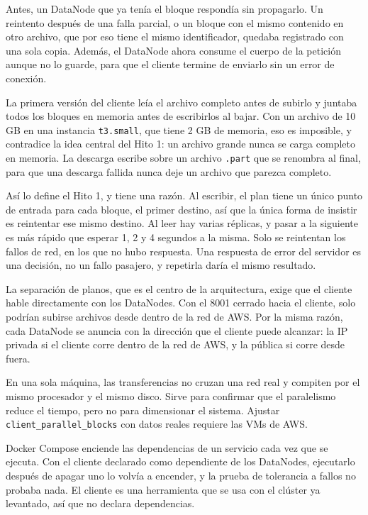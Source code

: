 \documentclass[10pt]{article}
\begin{document}
 Antes, un DataNode que ya tenía el bloque respondía sin propagarlo. Un reintento después de una falla parcial, o un bloque con el mismo contenido en otro archivo, que por eso tiene el mismo identificador, quedaba registrado con una sola copia. Además, el DataNode ahora consume el cuerpo de la petición aunque no lo guarde, para que el cliente termine de enviarlo sin un error de conexión.

 La primera versión del cliente leía el archivo completo antes de subirlo y juntaba todos los bloques en memoria antes de escribirlos al bajar. Con un archivo de 10 GB en una instancia \texttt{t3.small}, que tiene 2 GB de memoria, eso es imposible, y contradice la idea central del Hito 1: un archivo grande nunca se carga completo en memoria. La descarga escribe sobre un archivo \texttt{.part} que se renombra al final, para que una descarga fallida nunca deje un archivo que parezca completo.

 Así lo define el Hito 1, y tiene una razón. Al escribir, el plan tiene un único punto de entrada para cada bloque, el primer destino, así que la única forma de insistir es reintentar ese mismo destino. Al leer hay varias réplicas, y pasar a la siguiente es más rápido que esperar 1, 2 y 4 segundos a la misma. Solo se reintentan los fallos de red, en los que no hubo respuesta. Una respuesta de error del servidor es una decisión, no un fallo pasajero, y repetirla daría el mismo resultado.

 La separación de planos, que es el centro de la arquitectura, exige que el cliente hable directamente con los DataNodes. Con el 8001 cerrado hacia el cliente, solo podrían subirse archivos desde dentro de la red de AWS. Por la misma razón, cada DataNode se anuncia con la dirección que el cliente puede alcanzar: la IP privada si el cliente corre dentro de la red de AWS, y la pública si corre desde fuera.

 En una sola máquina, las transferencias no cruzan una red real y compiten por el mismo procesador y el mismo disco. Sirve para confirmar que el paralelismo reduce el tiempo, pero no para dimensionar el sistema. Ajustar \texttt{client\_parallel\_blocks} con datos reales requiere las VMs de AWS.

 Docker Compose enciende las dependencias de un servicio cada vez que se ejecuta. Con el cliente declarado como dependiente de los DataNodes, ejecutarlo después de apagar uno lo volvía a encender, y la prueba de tolerancia a fallos no probaba nada. El cliente es una herramienta que se usa con el clúster ya levantado, así que no declara dependencias.
\end{document}
